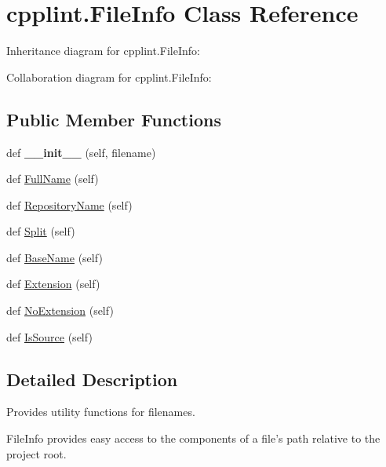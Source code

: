 \hypertarget{classcpplint_1_1FileInfo}{}\section{cpplint.\+File\+Info Class Reference}
\label{classcpplint_1_1FileInfo}


Inheritance diagram for cpplint.\+File\+Info\+:


Collaboration diagram for cpplint.\+File\+Info\+:
\subsection*{Public Member Functions}
\begin{DoxyCompactItemize}
\item 
\mbox{\label{classcpplint_1_1FileInfo_abd3ff77aab027af2476b3a1d97b1f89c}} 
def {\bfseries \+\_\+\+\_\+init\+\_\+\+\_\+} (self, filename)
\item 
def \hyperlink{classcpplint_1_1FileInfo_aed56577368c45cdf45fc4c9109129145}{Full\+Name} (self)
\item 
def \hyperlink{classcpplint_1_1FileInfo_a2b3b79b7d46221a6b9d0ea0bebac2061}{Repository\+Name} (self)
\item 
def \hyperlink{classcpplint_1_1FileInfo_a43f1c5ff1771da52e29c60c114955e72}{Split} (self)
\item 
def \hyperlink{classcpplint_1_1FileInfo_a1a12ed63ddc2ffd8f6a105e3ab4d6289}{Base\+Name} (self)
\item 
def \hyperlink{classcpplint_1_1FileInfo_a2554b504117839931e901b59a59c67ae}{Extension} (self)
\item 
def \hyperlink{classcpplint_1_1FileInfo_acb46555a72b346966f4bf28c08e3b1fa}{No\+Extension} (self)
\item 
def \hyperlink{classcpplint_1_1FileInfo_a157f8d3266d7291321db88cdad3b2879}{Is\+Source} (self)
\end{DoxyCompactItemize}


\subsection{Detailed Description}
\begin{DoxyVerb}Provides utility functions for filenames.

FileInfo provides easy access to the components of a file's path
relative to the project root.
\end{DoxyVerb}
 

